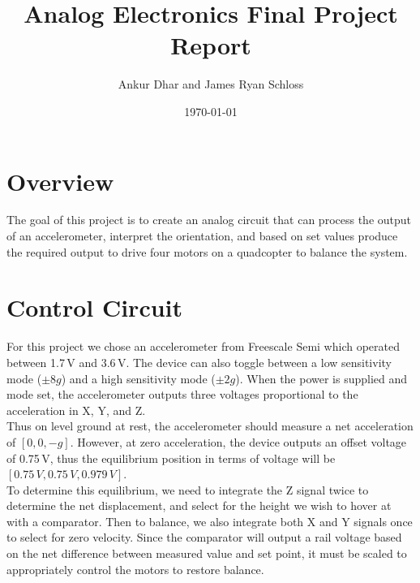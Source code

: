 \documentclass[11pt]{article} %
\title{Analog Electronics Final Project Report}
\author{Ankur Dhar and James Ryan Schloss}
\date{\today} %
\begin{document}
\maketitle
\section{Overview}
The goal of this project is to create an analog circuit that can process the output of an accelerometer, interpret the orientation, and based on set values produce the required output to drive four motors on a quadcopter to balance the system.

\section{Control Circuit}
For this project we chose an accelerometer from Freescale Semi which operated between 1.7\,V and 3.6\,V. The device can also toggle between a low sensitivity mode ($\pm8g$) and a high sensitivity mode ($\pm2g$). When the power is supplied and mode set, the accelerometer outputs three voltages proportional to the acceleration in X, Y, and Z.\\
Thus on level ground at rest, the accelerometer should measure a net acceleration of $[0,0,-g]$. However, at zero acceleration, the device outputs an offset voltage of 0.75\,V, thus the equilibrium position in terms of voltage will be $[0.75\,V,0.75\,V,0.979\,V]$.\\
To determine this equilibrium, we need to integrate the Z signal twice to determine the net displacement, and select for the height we wish to hover at with a comparator. Then to balance, we also integrate both X and Y signals once to select for zero velocity. Since the comparator will output a rail voltage based on the net difference between measured value and set point, it must be scaled to appropriately control the motors to restore balance.
\end{document}

